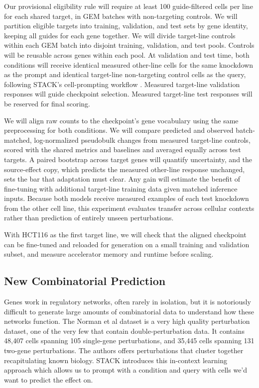 \documentclass[times, twoside, watermark]{zHenriquesLab-StyleBioRxiv}
\begin{document}
Our provisional eligibility rule will require at least 100 guide-filtered cells per line for each shared target, in GEM batches with non-targeting controls. We will partition eligible targets into training, validation, and test sets by gene identity, keeping all guides for each gene together. We will divide target-line controls within each GEM batch into disjoint training, validation, and test pools. Controls will be reusable across genes within each pool. At validation and test time, both conditions will receive identical measured other-line cells for the same knockdown as the prompt and identical target-line non-targeting control cells as the query, following STACK's cell-prompting workflow \cite{dong2026stack}. Measured target-line validation responses will guide checkpoint selection. Measured target-line test responses will be reserved for final scoring.

We will align raw counts to the checkpoint's gene vocabulary using the same preprocessing for both conditions. We will compare predicted and observed batch-matched, log-normalized pseudobulk changes from measured target-line controls, scored with the shared metrics and baselines and averaged equally across test targets. A paired bootstrap across target genes will quantify uncertainty, and the source-effect copy, which predicts the measured other-line response unchanged, sets the bar that adaptation must clear. Any gain will estimate the benefit of fine-tuning with additional target-line training data given matched inference inputs. Because both models receive measured examples of each test knockdown from the other cell line, this experiment evaluates transfer across cellular contexts rather than prediction of entirely unseen perturbations.

With HCT116 as the first target line, we will check that the aligned checkpoint can be fine-tuned and reloaded for generation on a small training and validation subset, and measure accelerator memory and runtime before scaling.

\subsection*{New Combinatorial Prediction} Genes work in regulatory networks, often rarely in isolation, but it is notoriously difficult to generate large amounts of combinatorial data to understand how these networks function. The Norman et al  dataset \cite{Norman2019} is a very high quality perturbation dataset, one of the very few that contain double-perturbation data. It contains 48,407 cells spanning 105 single-gene perturbations, and 35,445 cells spanning 131 two-gene perturbations. The authors offers perturbations that cluster together recapitulating known biology. STACK introduces this in-context learning approach which allows us to prompt with a condition and query with cells we’d want to predict the effect on. 
\end{document}
